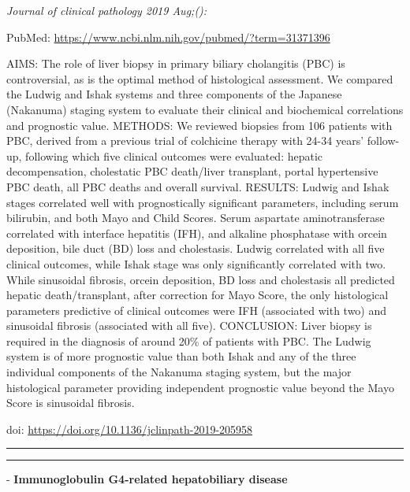 \documentclass[]{article}
\begin{document}
\emph{Journal of clinical pathology 2019 Aug;():}

PubMed: \url{https://www.ncbi.nlm.nih.gov/pubmed/?term=31371396}

AIMS: The role of liver biopsy in primary biliary cholangitis (PBC) is
controversial, as is the optimal method of histological assessment. We
compared the Ludwig and Ishak systems and three components of the
Japanese (Nakanuma) staging system to evaluate their clinical and
biochemical correlations and prognostic value. METHODS: We reviewed
biopsies from 106 patients with PBC, derived from a previous trial of
colchicine therapy with 24-34 years' follow-up, following which five
clinical outcomes were evaluated: hepatic decompensation, cholestatic
PBC death/liver transplant, portal hypertensive PBC death, all PBC
deaths and overall survival. RESULTS: Ludwig and Ishak stages correlated
well with prognostically significant parameters, including serum
bilirubin, and both Mayo and Child Scores. Serum aspartate
aminotransferase correlated with interface hepatitis (IFH), and alkaline
phosphatase with orcein deposition, bile duct (BD) loss and cholestasis.
Ludwig correlated with all five clinical outcomes, while Ishak stage was
only significantly correlated with two. While sinusoidal fibrosis,
orcein deposition, BD loss and cholestasis all predicted hepatic
death/transplant, after correction for Mayo Score, the only histological
parameters predictive of clinical outcomes were IFH (associated with
two) and sinusoidal fibrosis (associated with all five). CONCLUSION:
Liver biopsy is required in the diagnosis of around 20\% of patients
with PBC. The Ludwig system is of more prognostic value than both Ishak
and any of the three individual components of the Nakanuma staging
system, but the major histological parameter providing independent
prognostic value beyond the Mayo Score is sinusoidal fibrosis.

doi: \url{https://doi.org/10.1136/jclinpath-2019-205958}

{}

{}

\begin{center}\rule{0.5\linewidth}{\linethickness}\end{center}

\begin{center}\rule{0.5\linewidth}{\linethickness}\end{center}

 - \textbf{Immunoglobulin G4-related hepatobiliary disease}
\end{document}
